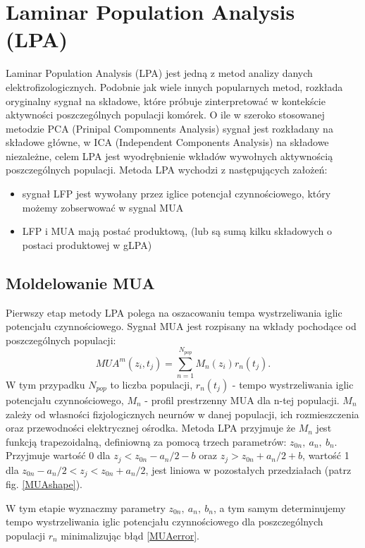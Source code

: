 \section{Laminar Population Analysis (LPA)}
Laminar Population Analysis (LPA) \cite{Einevoll2007} jest jedną z metod analizy danych elektrofizologicznych. Podobnie jak wiele innych popularnych metod, rozkłada oryginalny sygnał na składowe, które próbuje zinterpretować w kontekście aktywności poszczególnych populacji komórek. O ile w szeroko stosowanej metodzie PCA (Prinipal Compomnents Analysis) sygnał jest rozkładany na składowe główne, w ICA (Independent Components Analysis) na składowe niezależne, celem LPA jest wyodrębnienie wkładów wywołnych aktywnością poszczególnych populacji. Metoda LPA wychodzi z następujących założeń:
\begin{itemize}
\item sygnał LFP jest wywołany przez iglice potencjał czynnościowego, który możemy zobserwować w sygnal MUA
\item LFP i MUA mają postać produktową,  (lub są sumą kilku składowych o postaci produktowej w gLPA)
\end{itemize}
\subsection{Moldelowanie MUA}
Pierwszy etap metody LPA polega na oszacowaniu tempa wystrzeliwania iglic potencjału czynnościowego. Sygnał MUA jest rozpisany na wkłady pochodące od poszczególnych populacji:
\begin{equation}
MUA^m(z_i, t_j) = \sum^{N_{pop}}_{n=1} M_n(z_i)r_n(t_j).
\label{MUAdecomposition}
\end{equation}
W tym przypadku $N_{pop}$ to liczba populacji, $r_n(t_j)$ - tempo wystrzeliwania iglic potencjału czynnościowego,  $M_n$ - profil prestrzenny MUA dla n-tej populacji. $M_n$ zależy od własności fizjologicznych neurnów w danej populacji, ich rozmieszczenia oraz przewodności elektrycznej ośrodka. Metoda LPA przyjmuje że $M_n$ jest funkcją trapezoidalną, definiowną za pomocą trzech parametrów: $z_{0n}, \ a_n, \ b_n$. Przyjmuje wartość 0 dla $z_{j}< z_{0n} - a_n/2 - b$ oraz $z_{j} > z_{0n} + a_n/2 + b$, wartość 1 dla $z_{0n} - a_n/2 < z_j < z_{0n} + a_n/2$, jest liniowa w pozostałych przedziałach (patrz fig. \ref{MUAshape}).

W tym etapie wyznaczmy parametry $z_{0n}, \ a_n, \ b_n$, a tym samym determinujemy tempo wystrzeliwania iglic potencjału czynnościowego dla poszczególnych populacji $r_n$ minimalizując błąd \ref{MUAerror}.

